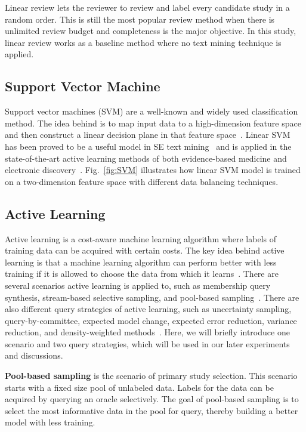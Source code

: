 \documentclass{svjour3}
\theoremstyle{break}
\begin{document}
Linear review lets the reviewer to review and label every candidate study in a random order. This is still the most popular review method when there is unlimited review budget and completeness is the major objective. In this study, linear review works as a baseline method where no text mining technique is applied.

\subsection{Support Vector Machine}
\label{sect: Support Vector Machine}

Support vector machines (SVM) are a well-known and widely used classification method. The idea behind is to map input data to a high-dimension feature space and then construct a linear decision plane in that feature space~\cite{cortes1995support}. Linear SVM~\cite{joachims2006training} has been proved to be a useful model in SE text mining~\cite{krishna2016bigse} and is applied in the state-of-the-art active learning methods of both evidence-based medicine and electronic discovery~\cite{miwa2014reducing,wallace2010semi,cormack2014evaluation}. Fig.~\ref{fig:SVM} illustrates how linear SVM model is trained on a two-dimension feature space with different data balancing techniques.

\subsection{Active Learning}
\label{sect: Active learning}

Active learning is a cost-aware machine learning algorithm where labels of training data can be acquired with certain costs. The key idea behind active learning is that a machine learning algorithm can perform better with less
training if it is allowed to choose the data from which it learns~\cite{settles2012active}. There are several scenarios active learning is applied to, such as membership query synthesis, stream-based selective sampling, and pool-based sampling~\cite{settles2010active}. There are also different query strategies of active learning, such as uncertainty sampling, query-by-committee, expected model change, expected error reduction, variance reduction, and density-weighted methods~\cite{settles2010active}. Here, we will briefly introduce one scenario and two query strategies, which will be used in our later experiments and discussions.

\textbf{Pool-based sampling} is the scenario of primary study selection. This scenario starts with a fixed size pool of unlabeled data. Labels for the data can be acquired by querying an oracle selectively. The goal of pool-based sampling is to select the most informative data in the pool for query, thereby building a better model with less training.
\end{document}
